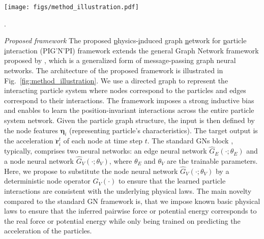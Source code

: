 \documentclass{article}
\newcommand{\pignpi}{PIG'N'PI\xspace}
\begin{document}
\begin{figure*}[t!]
\centering
\texttt{[image: figs/method\_illustration.pdf]}
\caption{\textbf{\underline{P}hysics-\underline{i}nduced \underline{g}raph \underline{n}etwork for \underline{p}article \underline{i}nteraction (\pignpi)}. (A) The workflow where the edge neural network $\hat{G}_E(\cdot; \theta_{E})$ takes edge features as input. The corresponding output message $\mathcal{M}_{ij}$ is the predicted pairwise force or potential energy, depending on the physics operator (B) or (C) in the node part. Parameters $\theta_{E}$ in $\hat{G}_E(\cdot; \theta_{E})$ are trained by minimizing the loss on particle acceleration.}.
\label{fig:method_illustration}
\end{figure*}


\textit{Proposed framework} The proposed  \underline{p}hysics-\underline{i}nduced \underline{g}raph \underline{n}etwork for \underline{p}article \underline{i}nteraction (\pignpi) framework extends the general Graph Network framework proposed by \cite{battaglia2018relational}, which is a generalized form of message-passing graph neural networks. The architecture of the proposed framework is illustrated in Fig.~\ref{fig:method_illustration}.  We use a directed graph to represent the interacting particle system where nodes correspond to the particles and edges correspond to their interactions. The framework imposes a strong inductive bias and enables to learn the position-invariant interactions across the entire particle system network. Given the particle graph structure, the input is then defined by the node features $\bm{\eta}_i$ (representing particle's characteristics). The target output is the acceleration $\bm{\ddot{r}}_i^{t}$ of each node at time step $t$. {The} standard GNs {block} \cite{battaglia2018relational}, typically, comprises two neural networks: an edge neural network $\hat{G}_E(\cdot; \theta_{E})$ and a node neural network $\hat{G}_V(\cdot; \theta_{V})$, where $\theta_{E}$ and $\theta_{V}$ are the trainable parameters. Here, we propose to substitute the node neural network $\hat{G}_V(\cdot; \theta_{V})$ by a deterministic node operator $G_V(\cdot)$ to ensure that the learned particle interactions are consistent with the underlying physical laws.  The main novelty compared to the standard GN framework is, that we impose known basic physical laws to ensure that the inferred pairwise force or potential energy corresponds to the real force or potential energy while only being trained on predicting the acceleration of the particles.
\end{document}
